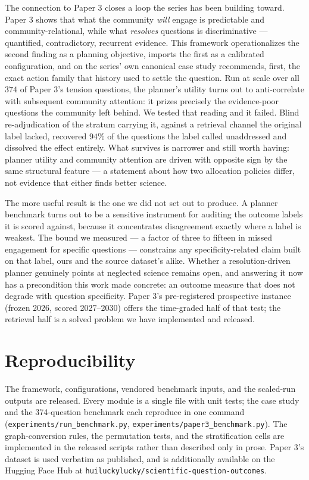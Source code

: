 \documentclass[11pt]{article}
\begin{document}
The connection to Paper 3 closes a loop the series has been building
toward. Paper 3 shows that what the community \emph{will} engage is
predictable and community-relational, while what \emph{resolves}
questions is discriminative --- quantified, contradictory, recurrent
evidence. This framework operationalizes the second finding as a
planning objective, imports the first as a calibrated configuration,
and on the series' own canonical case study recommends, first, the
exact action family that history used to settle the question. Run at
scale over all $374$ of Paper 3's tension questions, the planner's
utility turns out to anti-correlate with subsequent community
attention: it prizes precisely the evidence-poor questions the
community left behind. We tested that reading and it failed. Blind
re-adjudication of the stratum carrying it, against a retrieval channel
the original label lacked, recovered $94\%$ of the questions the label
called unaddressed and dissolved the effect entirely. What survives is
narrower and still worth having: planner utility and community
attention are driven with opposite sign by the same structural feature
--- a statement about how two allocation policies differ, not evidence
that either finds better science.

The more useful result is the one we did not set out to produce. A
planner benchmark turns out to be a sensitive instrument for auditing
the outcome labels it is scored against, because it concentrates
disagreement exactly where a label is weakest. The bound we measured
--- a factor of three to fifteen in missed engagement for specific
questions --- constrains any specificity-related claim built on that
label, ours and the source dataset's alike. Whether a
resolution-driven planner genuinely points at neglected science remains
open, and answering it now has a precondition this work made concrete:
an outcome measure that does not degrade with question specificity.
Paper 3's pre-registered prospective instance (frozen 2026, scored
2027--2030) offers the time-graded half of that test; the retrieval
half is a solved problem we have implemented and released.

\section*{Reproducibility}

The framework, configurations, vendored benchmark inputs, and the
scaled-run outputs are released. Every module is a single file with
unit tests; the case study and the 374-question benchmark each
reproduce in one command
(\texttt{experiments/run\_benchmark.py},
\texttt{experiments/paper3\_benchmark.py}). The graph-conversion rules,
the permutation tests, and the stratification cells are implemented in
the released scripts rather than described only in prose. Paper 3's
dataset is used verbatim as published, and is additionally available on
the Hugging Face Hub at
\texttt{huiluckylucky/scientific-question-outcomes}.
\end{document}
